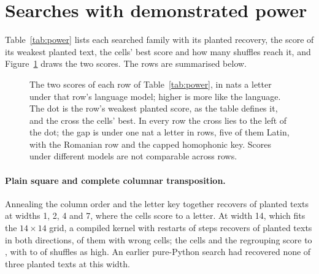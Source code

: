 \documentclass[11pt]{article}
\theoremstyle{definition}
\begin{document}
\section{Searches with demonstrated power}\label{sec:search}

Table~\ref{tab:power} lists each searched family with its planted recovery, the score of its weakest planted text, the cells' best score and how many shuffles reach it, and Figure~\ref{fig:power} draws the two scores. The rows are summarised below.

\begin{table}[t]
\centering
\caption{Searches with demonstrated power. ``Planted found'' counts planted texts recovered with at least 90 percent of letters right. ``Weakest planted'' is the true-key score per letter of the weakest planted text; in rows with slips or wrong cells it is the lowest score at which such a text was found. ``Cells' best'' is the best score per letter over the family on the printed cells and the regrouping together. \textsuperscript{a}~Family-wise: the cells' best over all variants against each shuffle's best over the same variants. The other entries compare the cells' best case with its own shuffles. The repeating-shift row compares the best of 24 cases with 3 shuffles of that case only.}
\label{tab:power}
\small

\end{table}

\begin{figure}[t]
\centering

\caption{The two scores of each row of Table~\ref{tab:power}, in nats a letter under that row's language model; higher is more like the language. The dot is the row's weakest planted score, as the table defines it, and the cross the cells' best. In every row the cross lies to the left of the dot; the gap is under one nat a letter in \gapUnderOne{} rows, five of them Latin, with the Romanian row and the capped homophonic key. Scores under different models are not comparable across rows.}
\label{fig:power}
\end{figure}

\paragraph{Plain square and complete columnar transposition.} Annealing the column order and the letter key together recovers \subRecovered{} of \subPlanted{} planted texts at widths 1, 2, 4 and 7, where the cells score \subCellsLow{} to \subCellsHigh{} a letter. At width 14, which fits the $14 \times 14$ grid, a compiled kernel with \widthFourteenRestarts{} restarts of \widthFourteenSteps{} steps recovers \widthFourteenRecovered{} of \widthFourteenPlanted{} planted texts in both directions, \widthFourteenWithErrors{} of them with \widthFourteenErrors{} wrong cells; the cells and the regrouping score \widthFourteenCellsLow{} to \widthFourteenCellsHigh{}, with \widthFourteenShufflesLow{} to \widthFourteenShufflesHigh{} of \widthFourteenShuffles{} shuffles as high. An earlier pure-Python search had recovered none of three planted texts at this width.
\end{document}
